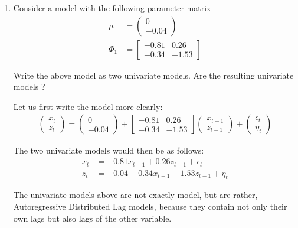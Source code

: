 \begin{enumerate}
    \item Consider a \varp[1]{} model with the following parameter matrix
          \begin{align*}
              \mu    & = \begin{pmatrix} 0 \\ -0.04 \end{pmatrix}                    \\
              \Phi_1 & = \begin{bmatrix} -0.81 & 0.26 \\ -0.34 & -1.53 \end{bmatrix}
          \end{align*}

          Write the above \varp[1]{} model as two univariate models. Are the resulting univariate models \arp[1]{}?

          \begin{sol}
              Let us first write the \varmapq[1, 1]{} model more clearly:
              \begin{align*}
                  \begin{pmatrix} x_{t} \\ z_{t} \end{pmatrix}
                  = \begin{pmatrix} 0 \\ -0.04 \end{pmatrix}
                  + \begin{bmatrix} -0.81 & 0.26 \\ -0.34 & -1.53 \end{bmatrix}
                  \begin{pmatrix} x_{t-1} \\ z_{t-1} \end{pmatrix}
                  + \begin{pmatrix} \epsilon_{t} \\ \eta_{t} \end{pmatrix}
              \end{align*}

              The two univariate models would then be as follows:
              \begin{align*}
                  x_t & = -0.81 x_{t-1} + 0.26 z_{t-1} + \epsilon_t    \\
                  z_t & = -0.04 - 0.34 x_{t-1} - 1.53 z_{t-1} + \eta_t
              \end{align*}

              The univariate models above are not exactly \arp[1]{} model, but are rather, Autoregressive Distributed Lag models, because they contain not only their own lags but also lags of the other variable.
          \end{sol}


\end{enumerate}
